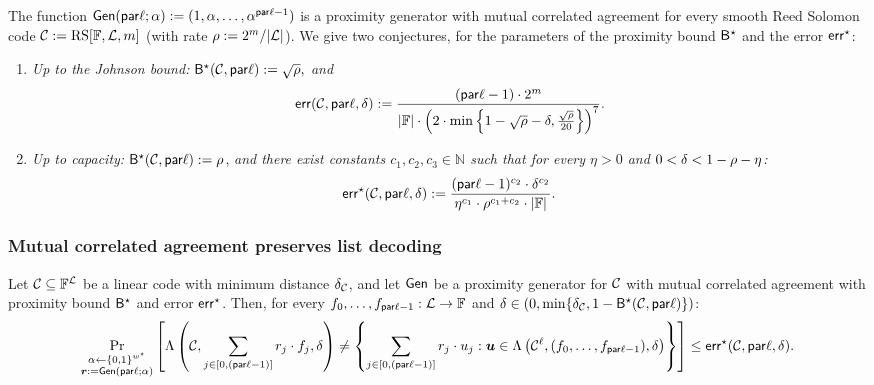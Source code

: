 \begin{theorem}
    The function $\mathsf{Gen}(\mathsf{par}\ell; \alpha) := (1, \alpha, \ldots, \alpha^{\mathsf{par}\ell - 1})$ is a proximity generator with mutual correlated agreement for every smooth Reed Solomon code $\mathcal{C} := \mathrm{RS}[\mathbb{F}, \mathcal{L}, m]$ (with rate $\rho := 2^m / |\mathcal{L}|$). We give two conjectures, for the parameters of the proximity bound ${\mathsf{B}}^\star$ and the error $\mathsf{err}^\star$:
    \begin{enumerate}
        \item \textit{Up to the Johnson bound:} ${\mathsf{B}}^\star(\mathcal{C}, \mathsf{par}\ell) := \sqrt{\rho},$ \textit{and}
        \[
        \mathsf{err}(\mathcal{C}, \mathsf{par}\ell, \delta) := \frac{(\mathsf{par}\ell - 1) \cdot 2^m}{|\mathbb{F}| \cdot \left( 2 \cdot \min\left\{1 - \sqrt{\rho} - \delta, \frac{\sqrt{\rho}}{20} \right\} \right)^7}.
        \]
      
        \item \textit{Up to capacity:} ${\mathsf{B}}^\star(\mathcal{C}, \mathsf{par}\ell) := \rho$, \textit{and there exist constants $c_1, c_2, c_3 \in \mathbb{N}$ such that for every $\eta > 0$ and $0 < \delta < 1 - \rho - \eta$:}
        \[
        \mathsf{err}^\star(\mathcal{C}, \mathsf{par}\ell, \delta) := \frac{(\mathsf{par}\ell - 1)^{c_2} \cdot \delta^{c_2}}{\eta^{c_1} \cdot \rho^{c_1 + c_2} \cdot |\mathbb{F}|}.
        \]
      \end{enumerate}
\end{theorem}

\subsubsection{Mutual correlated agreement preserves list decoding}

\begin{lemma}
    Let $\mathcal{C} \subseteq \mathbb{F}^{\mathcal{L}}$ be a linear code with minimum distance $\delta_{\mathcal{C}}$, and let $\mathsf{Gen}$ be a proximity generator for $\mathcal{C}$ with mutual correlated agreement with proximity bound ${\mathsf{B}}^\star$ and error $\mathsf{err}^\star$. Then, for every $f_0, \ldots, f_{\mathsf{par}\ell-1} : \mathcal{L} \to \mathbb{F}$ and $\delta \in (0, \min\{\delta_{\mathcal{C}}, 1 - {\mathsf{B}}^\star(\mathcal{C}, \mathsf{par}\ell)\})$:
    \[
    \Pr_{\substack{\alpha \leftarrow \{0,1\}^{w^\star} \\ \boldsymbol{r} := \mathsf{Gen}(\mathsf{par}\ell; \alpha)}} \left[
    \Lambda\left(\mathcal{C}, \sum_{j \in [0,(\mathsf{par}\ell-1)]} r_j \cdot f_j, \delta \right) \neq 
    \left\{ \sum_{j \in [0,(\mathsf{par}\ell-1)]} r_j \cdot u_j : \boldsymbol{u} \in \Lambda\left(\mathcal{C}^\ell, (f_0, \ldots, f_{\mathsf{par}\ell-1}), \delta \right) \right\}
    \right] \leq \mathsf{err}^\star(\mathcal{C}, \mathsf{par}\ell, \delta).
    \]
\end{lemma}

